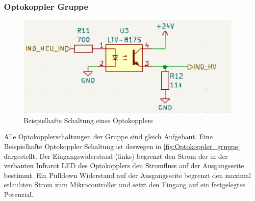 \subsubsection{Optokoppler Gruppe}
\begin{figure}[H]
	\centering
	\includegraphics[width=1.0\textwidth]{images/Hardware/Optokoppler_BSP.PNG}
	\caption{Beispielhafte Schaltung eines Optokopplers}
	\label{fig:Optokoppler_gruppe}
\end{figure}
Alle Optokopplerschaltungen der Gruppe sind gleich Aufgebaut. Eine Beispielhafte Optokoppler Schaltung ist deswegen in \autoref{fig:Optokoppler_gruppe} dargestellt. Der Eingangswiderstand (links) begrenzt den Strom der in der verbauten Infrarot LED des Optokopplers den Stromfluss auf der Ausgangsseite bestimmt. Ein Pulldown Widerstand auf der Ausgangsseite begrenzt den maximal erlaubten Strom zum Mikrocontroller und setzt den Eingang auf ein festgelegtes Potenzial.
